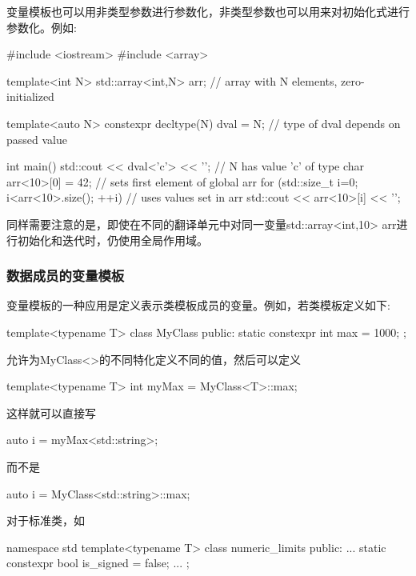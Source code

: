 变量模板也可以用非类型参数进行参数化，非类型参数也可以用来对初始化式进行参数化。例如:

\begin{cpp}
#include <iostream>
#include <array>

template<int N>
std::array<int,N> arr{}; // array with N elements, zero-initialized

template<auto N>
	constexpr decltype(N) dval = N; // type of dval depends on passed value

int main()
{
	std::cout << dval<'c'> << '\n'; // N has value 'c' of type char
	arr<10>[0] = 42; // sets first element of global arr
	for (std::size_t i=0; i<arr<10>.size(); ++i) { // uses values set in arr
		std::cout << arr<10>[i] << '\n';
	}
}
\end{cpp}

同样需要注意的是，即使在不同的翻译单元中对同一变量std::array<int,10> arr进行初始化和迭代时，仍使用全局作用域。

\subsubsection{数据成员的变量模板}

变量模板的一种应用是定义表示类模板成员的变量。例如，若类模板定义如下:

\begin{cpp}
template<typename T>
class MyClass {
	public:
	static constexpr int max = 1000;
};
\end{cpp}

允许为MyClass<>的不同特化定义不同的值，然后可以定义

\begin{cpp}
template<typename T>
int myMax = MyClass<T>::max;
\end{cpp}

这样就可以直接写

\begin{cpp}
auto i = myMax<std::string>;
\end{cpp}

而不是

\begin{cpp}
auto i = MyClass<std::string>::max;
\end{cpp}

对于标准类，如

\begin{cpp}
namespace std {
	template<typename T> class numeric_limits {
		public:
		...
		static constexpr bool is_signed = false;
		...
	};
}
\end{cpp}

